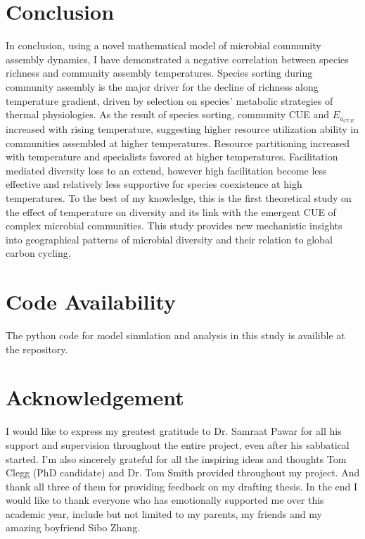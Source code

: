 \documentclass[11pt, a4paper]{article}
\begin{document}
\begin{spacing}{1.5}
\section{Conclusion}

In conclusion, using a novel mathematical model of microbial community assembly dynamics, I have demonstrated a negative correlation between species richness and community assembly temperatures. Species sorting during community assembly is the major driver for the decline of richness along temperature gradient, driven by selection on species' metabolic strategies of thermal physiologies. As the result of species sorting, community CUE and $E_{a_{CUE}}$ increased with rising temperature, suggesting higher resource utilization ability in communities assembled at higher temperatures. Resource partitioning increased with temperature and specialists favored at higher temperatures. Facilitation mediated diversity loss to an extend, however high facilitation become less effective and relatively less supportive for species coexistence at high temperatures. To the best of my knowledge, this is the first theoretical study on the effect of temperature on diversity and its link with the emergent CUE of complex microbial communities. This study provides new mechanistic insights into geographical patterns of microbial diversity and their relation to global carbon cycling. 

\section*{Code Availability}

The python code for model simulation and analysis in this study is availible at the \href{https://github.com/DaniDuan/CMEEProject}{} repository.

\section*{Acknowledgement}

I would like to express my greatest gratitude to Dr. Samraat Pawar for all his support and supervision throughout the entire project, even after his sabbatical started. I'm also sincerely grateful for all the inspiring ideas and thoughts Tom Clegg (PhD candidate) and Dr. Tom Smith provided throughout my project. And thank all three of them for providing feedback on my drafting thesis. In the end I would like to thank everyone who has emotionally supported me over this academic year, include but not limited to my parents, my friends and my amazing boyfriend Sibo Zhang. 



\clearpage



\end{spacing}
\end{document}
